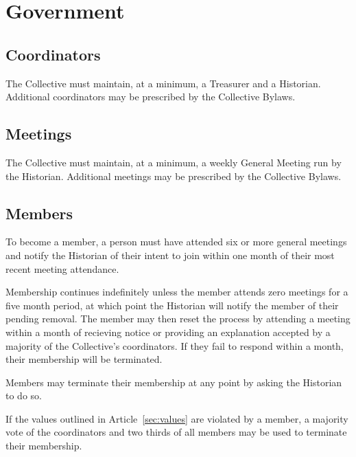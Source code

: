 \chapter{Government}

\section{Coordinators}\label{sec:coordinators}
The Collective must maintain, at a minimum, a Treasurer and a Historian. Additional coordinators may be prescribed by the Collective Bylaws.

\section{Meetings}\label{sec:meetings}
The Collective must maintain, at a minimum, a weekly General Meeting run by the Historian. Additional meetings may be prescribed by the Collective Bylaws.

\section{Members}\label{sec:members}
To become a member, a person must have attended six or more general meetings and notify the Historian of their intent to join within one month of their most recent meeting attendance.

Membership continues indefinitely unless the member attends zero meetings for a five month period, at which point the Historian will notify the member of their pending removal. The member may then reset the process by attending a meeting within a month of recieving notice or providing an explanation accepted by a majority of the Collective's coordinators. If they fail to respond within a month, their membership will be terminated.

Members may terminate their membership at any point by asking the Historian to do so.

If the values outlined in Article~\ref{sec:values} are violated by a member, a majority vote of the coordinators and two thirds of all members may be used to terminate their membership.
